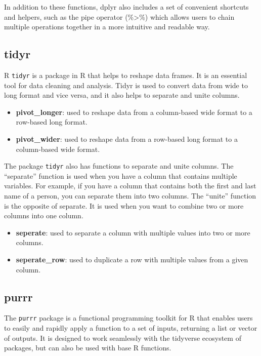 \documentclass[
]{book}
\providecommand{\tightlist}{%
  \setlength{\itemsep}{0pt}\setlength{\parskip}{0pt}}
\begin{document}
In addition to these functions, dplyr also includes a set of convenient shortcuts and helpers, such as the pipe operator (\%\textgreater\%) which allows users to chain multiple operations together in a more intuitive and readable way.

\hypertarget{tidyr}{%
\subsection{tidyr}\label{tidyr}}

R \texttt{tidyr} is a package in R that helps to reshape data frames. It is an essential tool for data cleaning and analysis. Tidyr is used to convert data from wide to long format and vice versa, and it also helps to separate and unite columns.

\begin{itemize}
\tightlist
\item
  \textbf{pivot\_longer}: used to reshape data from a column-based wide format to a row-based long format.
\item
  \textbf{pivot\_wider}: used to reshape data from a row-based long format to a column-based wide format.
\end{itemize}

The package \texttt{tidyr} also has functions to separate and unite columns. The ``separate'' function is used when you have a column that contains multiple variables. For example, if you have a column that contains both the first and last name of a person, you can separate them into two columns. The ``unite'' function is the opposite of separate. It is used when you want to combine two or more columns into one column.

\begin{itemize}
\tightlist
\item
  \textbf{seperate}: used to separate a column with multiple values into two or more columns.
\item
  \textbf{seperate\_row}: used to duplicate a row with multiple values from a given column.
\end{itemize}

\hypertarget{purrr}{%
\subsection{purrr}\label{purrr}}

The \texttt{purrr} package is a functional programming toolkit for R that enables users to easily and rapidly apply a function to a set of inputs, returning a list or vector of outputs. It is designed to work seamlessly with the tidyverse ecosystem of packages, but can also be used with base R functions.
\end{document}
